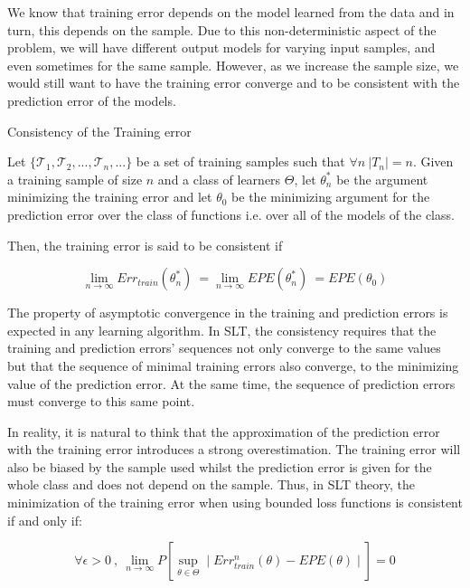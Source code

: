 We know that  training error depends on the model learned from the data and in turn, this depends on the sample. Due to this non-deterministic aspect of the problem, we will have different output  models for varying input samples, and even sometimes for the same sample. However, as we increase the sample size, we would still want to have the training error converge and to be consistent with the prediction error of the models.



\begin{definition}{Consistency of the Training error}
	
	Let $\{\mathcal {T}_1, \mathcal {T}_2, ..., \mathcal {T}_n, ...  \}$ be a set of training samples such that $\forall n \ |T_n|=n$. Given a training sample of size $n$ and a class of learners $\Theta$, let $\theta^{*}_n$ be the argument minimizing the training error and let $\theta_0$ be the minimizing argument for the prediction error over the class of functions i.e. over all of the models of the class.
	
	Then, the training error is said to be consistent if 
	
	$$\lim_{n\to\infty} Err_{train}(\theta^{*}_n) \  = \lim_{n\to\infty} EPE(\theta^{*}_n) \ =  EPE(\theta_0)$$
	
\end{definition}

The property of asymptotic convergence in the training and prediction errors is expected in any learning algorithm. In SLT, the consistency requires that the training and prediction errors'  sequences not only converge to the same values but that the sequence of minimal training errors also converge, to the minimizing value of the prediction error. At the same time, the sequence of prediction errors must converge to this same point. 

In reality, it is natural to think that the approximation of the prediction error with the training error introduces a strong overestimation. The training error will also be biased by the sample used whilst the prediction error is given for the whole class and does not depend on the sample. Thus, in SLT theory, the minimization of the training error when using bounded loss functions is consistent if and only if:


$$\forall \epsilon > 0 \ , \ \lim_{n\to\infty} P\left[ \sup_{\theta \in \Theta} \mid Err^{n}_{train}(\theta)  - EPE(\theta) \mid \right]  = 0 $$  %

